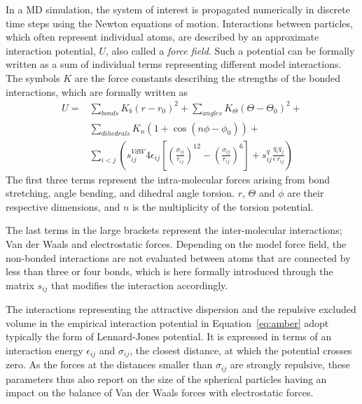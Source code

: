 In a MD simulation, the system of interest is propagated numerically in discrete time steps using
the Newton equations of motion. 
Interactions between particles, which often represent individual atoms, 
are described by an approximate interaction potential, $U$, also called a \emph{force field}. 
Such a potential can be formally written as a sum of individual terms representing different model interactions.
The symbols $K$ are the force constants describing the strengths of the bonded interactions,
which are formally written as
\begin{eqnarray}  \label{eq:amber}
  U = & \displaystyle \sum _{bonds} K_b (r-r_{0})^2 + \sum _{angles} K_\Theta (\Theta-\Theta_{0})^2 + \\ \nonumber
      & \displaystyle \sum _{dihedrals} K_n (1+\cos(n\phi -\phi_0)) + \\ \nonumber
      & \displaystyle \sum _{i<j} \left ( s_{ij} ^{VdW} 4 \epsilon _{ij} \left [ \left (\frac{\sigma _{ij}}{r_{ij}} \right )^{12} - \left ( \frac{\sigma _{ij}}{r_{ij}} \right )^6 \right ] + s_{ij}^q \frac{q_i q_j}{\epsilon \, r_{ij}} \right )
\end{eqnarray}
The first three terms represent the intra-molecular forces arising from bond stretching, angle bending, and dihedral angle torsion. 
$r$, $\Theta$ and $\phi$ are their respective dimensions,
and $n$ is the multiplicity of the torsion potential. 

The last terms in the large brackets represent the inter-molecular interactions; 
 Van der Waals and electrostatic forces. 
Depending on the model force field, the non-bonded interactions 
are not evaluated between atoms that are connected by less than three or four bonds, 
which is here formally introduced through the matrix $s_{ij}$ that modifies the interaction accordingly.

The interactions representing the 
attractive dispersion and the repulsive excluded volume 
in the empirical interaction potential in Equation~\ref{eq:amber} 
adopt typically the form of Lennard-Jones potential. 
It is expressed in terms of an interaction energy $\epsilon_{ij}$ and 
$\sigma_{ij}$, the closest distance,
at which the potential crosses zero. 
As the forces at the distances smaller than $\sigma _{ij}$ are strongly repulsive,
these parameters thus also report on the size of the spherical particles
having an impact on the balance of Van der Waals forces with electrostatic forces.


